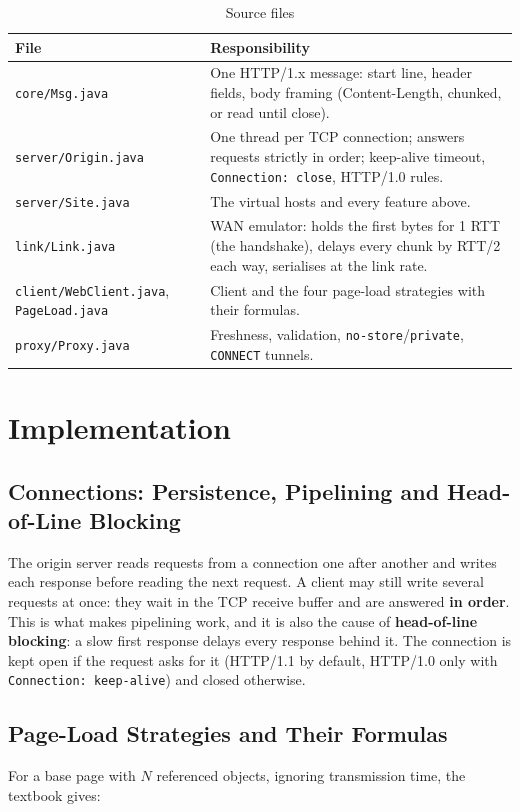 \documentclass[11pt,a4paper]{article}
\begin{document}
\begin{table}[H]
\centering
\caption{Source files}
\small
\begin{tabularx}{\textwidth}{@{}lY@{}}
\toprule
\textbf{File} & \textbf{Responsibility} \\ \midrule
\texttt{core/Msg.java} & One HTTP/1.x message: start line, header fields, body framing (Content-Length, chunked, or read until close). \\
\texttt{server/Origin.java} & One thread per TCP connection; answers requests strictly in order; keep-alive timeout, \texttt{Connection: close}, HTTP/1.0 rules. \\
\texttt{server/Site.java} & The virtual hosts and every feature above. \\
\texttt{link/Link.java} & WAN emulator: holds the first bytes for 1 RTT (the handshake), delays every chunk by RTT/2 each way, serialises at the link rate. \\
\texttt{client/WebClient.java}, \texttt{PageLoad.java} & Client and the four page-load strategies with their formulas. \\
\texttt{proxy/Proxy.java} & Freshness, validation, \texttt{no-store}/\texttt{private}, \texttt{CONNECT} tunnels. \\ \bottomrule
\end{tabularx}
\end{table}

\section{Implementation}

\subsection{Connections: Persistence, Pipelining and Head-of-Line Blocking}
The origin server reads requests from a connection one after another and writes each response before reading the next request. A client may still write several requests at once: they wait in the TCP receive buffer and are answered \textbf{in order}. This is what makes pipelining work, and it is also the cause of \textbf{head-of-line blocking}: a slow first response delays every response behind it. The connection is kept open if the request asks for it (HTTP/1.1 by default, HTTP/1.0 only with \texttt{Connection: keep-alive}) and closed otherwise.

\subsection{Page-Load Strategies and Their Formulas}
For a base page with $N$ referenced objects, ignoring transmission time, the textbook gives:
\end{document}
